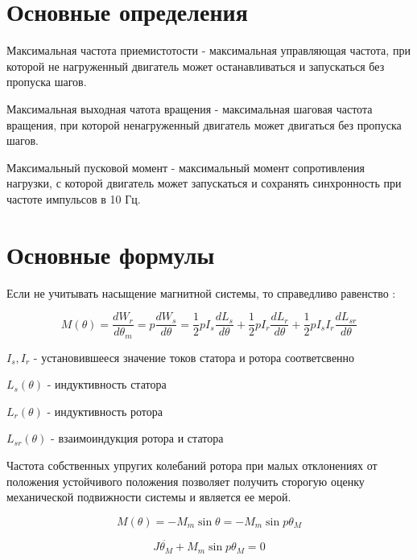 \part{ Основные определения }
Максимальная частота приемистотости - максимальная управляющая частота, при которой не нагруженный
двигатель может останавливаться и запускаться без пропуска шагов.

Максимальная выходная чатота вращения - максимальная шаговая частота вращения, при которой
ненагруженный двигатель может двигаться без пропуска шагов.

Максимальный пусковой момент - максимальный момент сопротивления нагрузки, с которой двигатель может
запускаться и сохранять синхронность при частоте импульсов в 10 Гц.

\part{ Основные формулы }

Если не учитывать насыщение магнитной системы, то справедливо равенство \cite[стр. 82]{Chilikin}:

\begin{equation}
\label{step_motor_torque_common}
    M(\theta)
    = \frac{dW_r}{d\theta_m}
    = p \frac{dW_s}{d\theta}
    = \frac{1}{2} p I_s \frac{dL_s}{d\theta}
        + \frac{1}{2} p I_r \frac{dL_r}{d\theta}
        + \frac{1}{2} p I_{s} I_r \frac{dL_{sr}}{d\theta}
\end{equation}

$I_{s}, I_{r}$ - установившееся значение токов статора и ротора соответсвенно

$L_{s}(\theta)$ - индуктивность статора

$L_{r}(\theta)$ - индуктивность ротора

$L_{sr}(\theta)$ - взаимоиндукция ротора и статора

Частота собственных упругих колебаний ротора \cite[гл 3.1]{Chilikin} при малых отклонениях от положения устойчивого
положения позволяет получить сторогую оценку механической подвижности системы и является ее мерой.

\begin{equation}
\label{step_motor_torque_without_load_and_with_unstable_rotor}
    M(\theta)
    = - M_{m} \sin{\theta}
    = - M_{m} \sin{p\theta_{M}}
\end{equation}

\begin{equation}
\label{step_motor_dynamic_move_equation}
    J \ddot{ \theta_{M} } + M_{m} \sin{p \theta_{M}} = 0
\end{equation}


